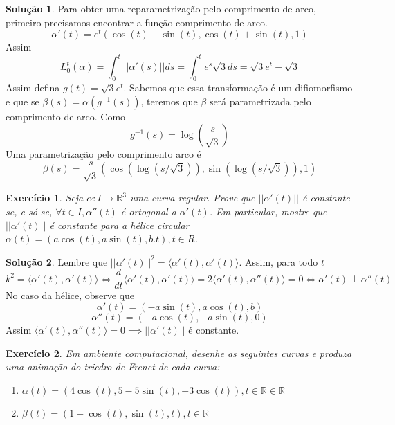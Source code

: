 \documentclass[a4paper,12pt]{article}
\newcommand{\R}{\mathbb{R}}
\theoremstyle{exer}
\newtheorem{exercise}{Exercício}
\theoremstyle{definition}
\newtheorem{solution}{Solução}
\theoremstyle{plain}
\begin{document}
\begin{solution}
    Para obter uma reparametrização pelo comprimento de arco, primeiro
    precisamos encontrar a função comprimento de arco. 
    $$
    \alpha'(t) = e^t(\cos(t) - \sin(t), \cos(t) + \sin(t), 1)
    $$
    Assim
    $$
    L_0^t(\alpha) = \int_0^t ||\alpha'(s)||ds = \int_0^t e^s\sqrt{3}ds = \sqrt{3}e^t - \sqrt{3}
    $$
    Assim defina $g(t) = \sqrt{3}e^t$. Sabemos que essa transformação é um
    difiomorfismo e que se $\beta(s) = \alpha(g^{-1}(s))$, teremos que $\beta$
    será parametrizada pelo comprimento de arco. Como 
    $$
    g^{-1}(s) = \log\left(\frac{s}{\sqrt{3}}\right)
    $$
    Uma parametrização pelo comprimento arco é 
    $$
    \beta(s) = \frac{s}{\sqrt{3}}\left(\cos(\log(s/\sqrt{3})), \sin(\log(s/\sqrt{3})), 1\right)
    $$
\end{solution}

\begin{exercise}
    Seja $\alpha : I \to \R^3$ uma curva regular. Prove que $||\alpha'(t)||$ é
    constante se, e só se, $\forall t \in I, \alpha''(t)$ é ortogonal a
    $\alpha'(t)$. Em particular, mostre que $||\alpha'(t)||$ é constante para a hélice circular $\alpha(t) = (a\cos(t), a\sin(t), b.t), t \in R$.
\end{exercise}

\begin{solution}
    Lembre que $||\alpha '(t)||^2 = \langle \alpha '(t), \alpha'(t) \rangle$.
    Assim, para todo $t$ 
    $$
    k^2 = \langle \alpha '(t), \alpha'(t) \rangle \iff \frac{d}{dt}\langle \alpha '(t), \alpha'(t) \rangle = 2\langle \alpha '(t), \alpha''(t) \rangle = 0 \iff \alpha'(t) \perp \alpha''(t)
    $$
    No caso da  hélice, observe que 
    $$
    \alpha'(t) = (-a\sin(t), a\cos(t), b)
    $$
    $$
    \alpha''(t) = (-a\cos(t), -a\sin(t), 0)
    $$
    Assim $\langle \alpha '(t), \alpha ''(t) \rangle = 0 \implies
    ||\alpha'(t)||$ é constante. 
\end{solution}

\begin{exercise}
    Em ambiente computacional, desenhe as seguintes curvas e produza uma
    animação do triedro de Frenet de cada curva:
    \begin{enumerate}
        \item[(a)] $\alpha(t) = (4\cos(t), 5 - 5\sin(t), - 3\cos(t)), t \in \R
        \in \R$
        \item [(b)] $\beta(t) = (1 - \cos(t), \sin(t), t), t \in \R$
    \end{enumerate}
\end{exercise}
\end{document}
